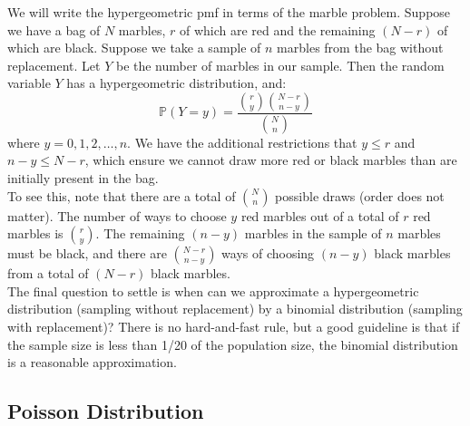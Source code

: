 \documentclass[12pt]{article}
\theoremstyle{definition}
\theoremstyle{remark}
\def\P{{\mathbb P}}
\begin{document}
We will write the hypergeometric pmf in terms of the marble problem. Suppose we have a bag of $N$ marbles, $r$
of which are red and the remaining $(N - r)$ of which are black. Suppose we take a sample of $n$ marbles from the bag without replacement. Let $Y$ be the number of marbles in our sample. Then the random variable $Y$ has a hypergeometric distribution, and:
\[
\P(Y = y) = \frac{ \binom{r}{y} \binom{N-r}{n-y} }{ \binom{N}{n} }
\]
where $y = 0, 1, 2, \dots, n$. We have the additional restrictions that $y \leq r$ and $n - y \leq N - r$, which ensure we cannot draw more red or black marbles than are initially present in the bag.\\

To see this, note that there are a total of $\binom{N}{n}$ possible draws (order does not matter). The number of ways to choose $y$ red marbles out of a total of $r$ red marbles is $\binom{r}{y}$. The remaining $(n - y)$ marbles in the sample of $n$ marbles must be black, and there are $\binom{N - r}{n - y}$ ways of choosing $(n - y)$ black marbles from a total of $(N - r)$ black marbles. \\

The final question to settle is when can we approximate a hypergeometric distribution (sampling without replacement) by a binomial distribution (sampling with replacement)? There is no hard-and-fast rule, but a good guideline is that if the sample size is less than 1/20 of the population size, the binomial distribution is a reasonable approximation. 

\subsection{Poisson Distribution}
\end{document}
